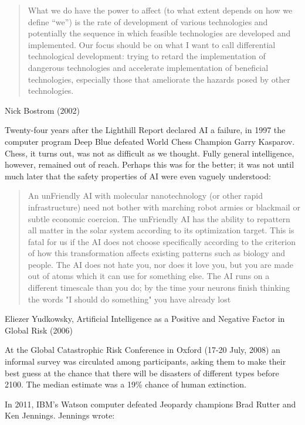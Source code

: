 \documentclass{article}
\begin{document}


\blockquote{What we do have the power to affect (to what extent depends on how
we define ``we'') is the rate of development of various technologies and
potentially the sequence in which feasible technologies are developed and
implemented. Our focus should be on what I want to call differential
technological development: trying to retard the implementation of dangerous
technologies and accelerate implementation of beneficial technologies,
especially those that ameliorate the hazards posed by other
technologies.}{Nick Bostrom (2002)}

\divider

Twenty-four years after the Lighthill Report declared AI a failure, in 1997 the
computer program Deep Blue defeated World Chess Champion Garry Kasparov. Chess,
it turns out, was not as difficult as we thought. Fully general intelligence,
however, remained out of reach. Perhaps this was for the better; it was not
until much later that the safety properties of AI were even vaguely understood:

\divider

\blockquote{An unFriendly AI with molecular nanotechnology (or other rapid
infrastructure) need not bother with marching robot armies or blackmail or
subtle economic coercion. The unFriendly AI has the ability to repattern all
matter in the solar system according to its optimization target. This is fatal
for us if the AI does not choose specifically according to the criterion of how
this transformation affects existing patterns such as biology and people. The
AI does not hate you, nor does it love you, but you are made out of atoms which
it can use for something else. The AI runs on a different timescale than you
do; by the time your neurons finish thinking the words "I should do something"
you have already lost}{Eliezer Yudkowsky, Artificial Intelligence as a Positive
and Negative Factor in Global Risk (2006)}

\divider

At the Global Catastrophic Risk Conference in Oxford (17-20 July, 2008) an
informal survey was circulated among participants, asking them to make their
best guess at the chance that there will be disasters of different types before
2100. The median estimate was a 19\% chance of human extinction.

\divider

In 2011, IBM's Watson computer defeated Jeopardy champions Brad Rutter and Ken
Jennings. Jennings wrote:
\end{document}
